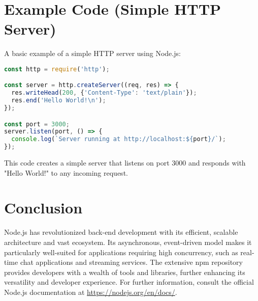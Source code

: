 \documentclass{article}
\begin{document}
\section{Example Code (Simple HTTP Server)}

A basic example of a simple HTTP server using Node.js:

\begin{lstlisting}[language=JavaScript, caption=Simple HTTP Server in Node.js, basicstyle=\ttfamily\footnotesize]
const http = require('http');

const server = http.createServer((req, res) => {
  res.writeHead(200, {'Content-Type': 'text/plain'});
  res.end('Hello World!\n');
});

const port = 3000;
server.listen(port, () => {
  console.log(`Server running at http://localhost:${port}/`);
});
\end{lstlisting}

This code creates a simple server that listens on port 3000 and responds with "Hello World!" to any incoming request.


\section{Conclusion}

Node.js has revolutionized back-end development with its efficient, scalable architecture and vast ecosystem.  Its asynchronous, event-driven model makes it particularly well-suited for applications requiring high concurrency, such as real-time chat applications and streaming services.  The extensive npm repository provides developers with a wealth of tools and libraries, further enhancing its versatility and developer experience.  For further information, consult the official Node.js documentation at \href{https://nodejs.org/en/docs/}{https://nodejs.org/en/docs/}.
\end{document}
